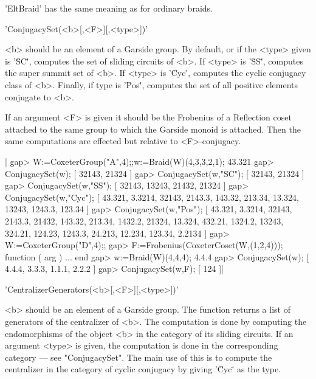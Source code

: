 'EltBraid'  has the  same  meaning as  for ordinary braids.



'ConjugacySet(<b>[,<F>][,<type>])'

<b>  should be an element of a Garside  group. By default, or if the <type>
given  is '\"SC\"', computes the set of  sliding circuits of <b>. If <type>
is  '\"SS\"', computes the super summit set of <b>. If <type> is '\"Cyc\"',
computes  the cyclic conjugacy class of <b>. Finally, if type is '\"Pos\"',
computes the set of all positive elements conjugate to <b>.

If  an argument  <F> is  given it  should be  the Frobenius of a Reflection
coset  attached to the same group to  which the Garside monoid is attached.
Then the same computations are effected but relative to <F>-conjugacy.

|    gap> W:=CoxeterGroup("A",4);;w:=Braid(W)(4,3,3,2,1);
    43.321
    gap> ConjugacySet(w);
    [ 32143, 21324 ]
    gap> ConjugacySet(w,"SC");
    [ 32143, 21324 ]
    gap> ConjugacySet(w,"SS");
    [ 32143, 13243, 21432, 21324 ]
    gap> ConjugacySet(w,"Cyc");
    [ 43.321, 3.3214, 32143, 2143.3, 143.32, 213.34, 13.324, 13243, 
      1243.3, 123.34 ]
    gap> ConjugacySet(w,"Pos");
    [ 43.321, 3.3214, 32143, 2143.3, 21432, 143.32, 213.34, 1432.2, 
      21324, 13.324, 432.21, 1324.2, 13243, 324.21, 124.23, 1243.3,
      24.213, 12.234, 123.34, 2.2134 ]
    gap> W:=CoxeterGroup("D",4);;
    gap> F:=Frobenius(CoxeterCoset(W,(1,2,4)));
    function ( arg ) ... end
    gap> w:=Braid(W)(4,4,4);
    4.4.4
    gap> ConjugacySet(w);
    [ 4.4.4, 3.3.3, 1.1.1, 2.2.2 ]
    gap> ConjugacySet(w,F);
    [ 124 ]|



'CentralizerGenerators(<b>[,<F>][,<type>])'

<b> should be an element of a Garside group. The function returns a list of
generators  of the centralizer of <b>. The computation is done by computing
the  endomorphisms  of  the  object  <b>  in  the  category  of its sliding
circuits.  If an argument <type>  is given, the computation  is done in the
corresponding  category --- see "ConjugacySet". The  main use of this is to
compute  the  centralizer  in  the  category  of cyclic conjugacy by giving
'\"Cyc\"' as the type.

